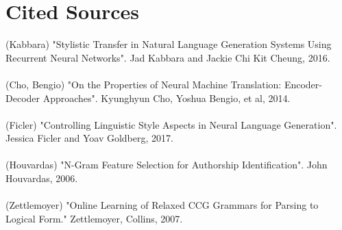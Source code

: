 \documentclass[11pt]{article}
\begin{document}
\section{Cited Sources}
(Kabbara) "Stylistic Transfer in Natural Language Generation Systems Using Recurrent Neural Networks". Jad Kabbara and Jackie Chi Kit Cheung, 2016.\\ \\
(Cho, Bengio) "On the Properties of Neural Machine Translation: Encoder-Decoder Approaches". Kyunghyun Cho, Yoshua Bengio, et al, 2014.\\ \\
(Ficler) "Controlling Linguistic Style Aspects in Neural Language Generation". Jessica Ficler and Yoav Goldberg, 2017. \\ \\
(Houvardas) "N-Gram Feature Selection for Authorship Identification". John Houvardas, 2006.\\ \\
(Zettlemoyer) "Online Learning of Relaxed CCG Grammars for Parsing to Logical Form." Zettlemoyer, Collins, 2007.
\end{document}
